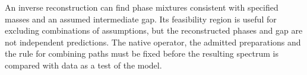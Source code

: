 An inverse reconstruction can find phase mixtures consistent with
specified masses and an assumed intermediate gap. Its feasibility
region is useful for excluding combinations of assumptions, but the
reconstructed phases and gap are not independent predictions. The
native operator, the admitted preparations and the rule for combining
paths must be fixed before the resulting spectrum is compared with
data as a test of the model.
